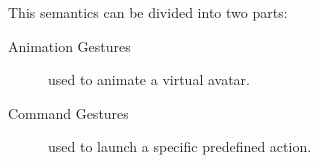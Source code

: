 \documentclass{llncs}
\newcommand\ignore[1]{}
\begin{document}
This semantics can be divided into two parts:
\begin{description}
 \item[Animation Gestures] used to animate a virtual avatar.
 \item[Command Gestures] used to launch a specific predefined action.
\end{description}

\ignore{
Gesture recognition got the attention of HCI researchers in order to find better
ways to talk to the computer. The first one was the Hand Gestural Cursor
(Put-That-There) aiming to the simplification of the means of communication
between human and the machine.
Since then, the gesture definition included more techniques and got applied on
the 2D recognition which is the multi-touch gestures.
}
\end{document}
